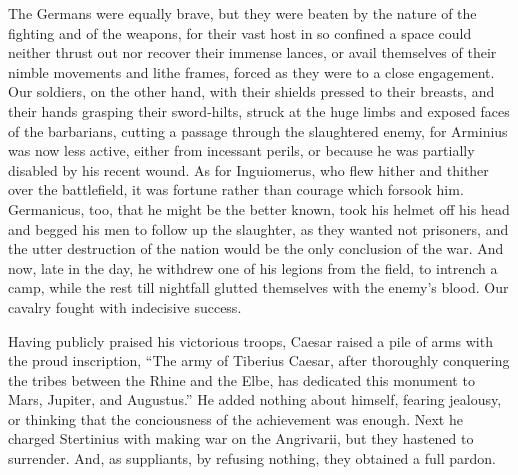 The Germans were equally brave, but they were beaten by the nature of the fighting and of the weapons, for their vast host in so confined a space could neither thrust out nor recover their immense lances, or avail themselves of their nimble movements and lithe frames, forced as they were to a close engagement. Our soldiers, on the other hand, with their shields pressed to their breasts, and their hands grasping their sword-hilts, struck at the huge limbs and exposed faces of the barbarians, cutting a passage through the slaughtered enemy, for Arminius was now less active, either from incessant perils, or because he was partially disabled by his recent wound. As for Inguiomerus, who flew hither and thither over the battlefield, it was fortune rather than courage which forsook him. Germanicus, too, that he might be the better known, took his helmet off his head and begged his men to follow up the slaughter, as they wanted not prisoners, and the utter destruction of the nation would be the only conclusion of the war. And now, late in the day, he withdrew one of his legions from the field, to intrench a camp, while the rest till nightfall glutted themselves with the enemy's blood. Our cavalry fought with indecisive success.


Having publicly praised his victorious troops, Caesar raised a pile of arms with the proud inscription, ``The army of Tiberius Caesar, after thoroughly conquering the tribes between the Rhine and the Elbe, has dedicated this monument to Mars, Jupiter, and Augustus.'' He added nothing about himself, fearing jealousy, or thinking that the conciousness of the achievement was enough. Next he charged Stertinius with making war on the Angrivarii, but they hastened to surrender. And, as suppliants, by refusing nothing, they obtained a full pardon.


